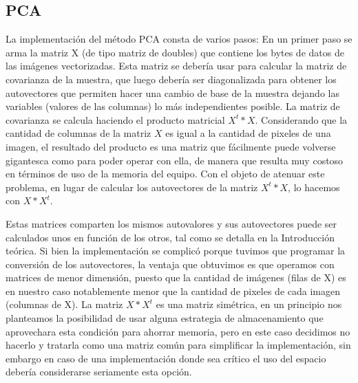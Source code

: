 \subsection*{PCA}
La implementación del método PCA consta de varios pasos:
En un primer paso se arma la matriz X (de tipo matriz de doubles) que contiene los bytes de datos de las imágenes vectorizadas. Esta matriz se debería usar para calcular la matriz de covarianza de la muestra, que luego debería ser diagonalizada para obtener los autovectores que permiten hacer una cambio de base de la muestra dejando las variables (valores de las columnas) lo más independientes posible.
La matriz de covarianza se calcula haciendo el producto matricial $X^{t} * X$. Considerando que la cantidad de columnas de la matriz $X$ es igual a la cantidad de pixeles de una imagen, el resultado del producto es una matriz que fácilmente puede volverse gigantesca como para poder operar con ella, de manera que resulta muy costoso en términos de uso de la memoria del equipo. Con el objeto de atenuar este problema, en lugar de calcular los autovectores de la matriz $X^{t} * X$, lo hacemos con $X * X^{t}$.
\par Estas matrices comparten los mismos autovalores y sus autovectores puede ser calculados unos en función de los otros, tal como se detalla en la Introducción teórica. Si bien la implementación se complicó porque tuvimos que programar la conversión de los autovectores, la ventaja que obtuvimos es que operamos con matrices de menor dimensión, puesto que la cantidad de imágenes (filas de X) es en nuestro caso notablemente menor que la cantidad de pixeles de cada imagen (columnas de X).
La matriz $X * X^{t}$ es una matriz simétrica, en un principio nos planteamos la posibilidad de usar alguna estrategia de almacenamiento que aprovechara esta condición para ahorrar memoria, pero en este caso decidimos no hacerlo y tratarla como una matriz común para simplificar la implementación, sin embargo en caso de una implementación donde sea crítico el uso del espacio debería considerarse seriamente esta opción.

